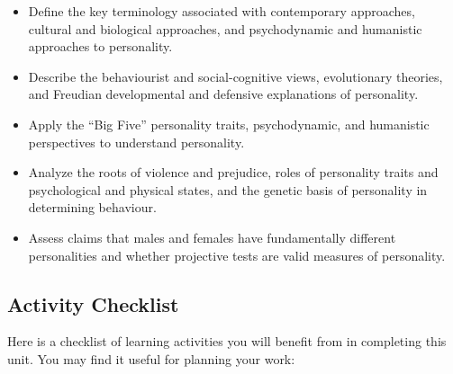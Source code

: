 \documentclass[
]{book}
\providecommand{\tightlist}{%
  \setlength{\itemsep}{0pt}\setlength{\parskip}{0pt}}
\begin{document}
\begin{itemize}
\tightlist
\item
  Define the key terminology associated with contemporary approaches, cultural and biological approaches, and psychodynamic and humanistic approaches to personality.\\
\item
  Describe the behaviourist and social-cognitive views, evolutionary theories, and Freudian developmental and defensive explanations of personality.\\
\item
  Apply the ``Big Five'' personality traits, psychodynamic, and humanistic perspectives to understand personality.\\
\item
  Analyze the roots of violence and prejudice, roles of personality traits and psychological and physical states, and the genetic basis of personality in determining behaviour.\\
\item
  Assess claims that males and females have fundamentally different personalities and whether projective tests are valid measures of personality.
\end{itemize}

\hypertarget{activity-checklist-4}{%
\subsection*{Activity Checklist}\label{activity-checklist-4}}

Here is a checklist of learning activities you will benefit from in completing this unit. You may find it useful for planning your work:
\end{document}
